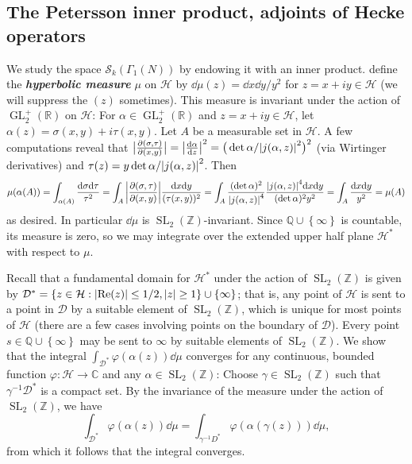 \documentclass[10pt,leqno,twoside,b5paper]{article}
\theoremstyle{plain}
\theoremstyle{definition}
\numberwithin{equation}{section}
\numberwithin{lem}{section}
\newcommand{\cbr}[1]{\left\{#1\right\}}
\newcommand{\textib}[1]{\textbf{\textit{#1\index{#1}}}} %
\DeclareMathOperator{\GL}{GL}
\DeclareMathOperator{\SL}{SL}
\newcommand{\slz}{\SL_2(\mathbb{Z})}
\newcommand{\glrp}{\GL_2^+(\mathbb{R})}
\begin{document}
\subsection{The Petersson inner product, adjoints of Hecke operators}
We study the space $\mathcal S_k(\varGamma_1(N))$ by endowing it with an inner product. define the \textib{hyperbolic measure} $\mu$ on $\mathcal H$ by $\dd\mu(z) = \dd x \dd y / y^2$ for $z = x+iy\in\mathcal H$ (we will suppress the $(z)$ sometimes). This measure is invariant under the action of $\glrp$ on $\mathcal H$: For $\alpha \in \glrp$ and $z=x+iy \in \mathcal H$, let $\alpha(z) = \sigma(x,y) + i\tau(x,y)$. Let $A$ be a measurable set in $\mathcal H$. A few computations reveal that $\big|\frac{\partial (\sigma,\tau)}{\partial(x,y)}\big| = \abs{\dv{\alpha}{z}}^2 = \big(\det\alpha/\abs{j(\alpha,z)}^2\big)^2$ (via Wirtinger derivatives) and $\tau(z) = y\det\alpha/\abs{j(\alpha,z)}^2$. Then \[\mu(\alpha(A)) = \int_{\alpha(A)} \frac{\dd\sigma\dd\tau}{\tau^2} = \int_{A}\bigg|\frac{\partial (\sigma,\tau)}{\partial(x,y)}\bigg|\frac{\dd x\dd y}{(\tau(x,y))^2} = \int_A \frac{(\det\alpha)^2}{\abs{j(\alpha,z)}^4}\frac{\abs{j(\alpha,z)}^4\dd x \dd y}{(\det\alpha)^2y^2} =\int_A \frac{\dd x \dd y}{y^2} = \mu(A)\]
as desired. In particular $\dd \mu$ is $\slz$-invariant. Since $\mathbb Q\cup\cbr{\infty}$ is countable, its measure is zero, so we may integrate over the extended upper half plane $\mathcal H^\ast$ with respect to $\mu$.

Recall that a fundamental domain for $\mathcal H^\ast$ under the action of $\slz$ is given by $\mathcal D^\ast = \cbr{z\in\mathcal H : \abs{\Re(z)}\leq 1/2,\abs{z}\geq 1}\cup\cbr{\infty}$; that is, any point of $\mathcal H$ is sent to a point in $\mathcal D$ by a suitable element of $\slz$, which is unique for most points of $\mathcal H$ (there are a few cases involving points on the boundary of $\mathcal D$). Every point $s\in\mathbb Q\cup\cbr{\infty}$ may be sent to $\infty$ by suitable elements of $\slz$. We show that the integral $\int_{\mathcal D^\ast} \varphi(\alpha(z))\dd \mu$ converges for any continuous, bounded function $\varphi\colon\mathcal H\to\mathbb C$ and any $\alpha\in\slz$: Choose $\gamma\in\slz$ such that $\gamma^{-1}\mathcal D^\ast$ is a compact set. By the invariance of the measure under the action of $\slz$, we have
\[\int_{\mathcal D^\ast} \varphi(\alpha(z))\dd \mu = \int_{\mathcal \gamma^{-1} D^\ast} \varphi(\alpha(\gamma(z)))\dd \mu, \] from which it follows that the integral converges.
\end{document}
